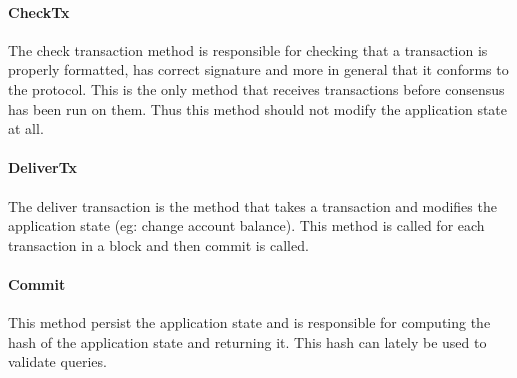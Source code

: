 \documentclass{article}
\begin{document}
	\paragraph{CheckTx}
	The check transaction method is responsible for checking that a transaction is properly formatted, has correct signature and more in general that it conforms to the protocol. This is the only method that receives transactions before consensus has been run on them. Thus this method should not modify the application state at all.
	\paragraph{DeliverTx}
	The deliver transaction is the method that takes a transaction and modifies the application state (eg: change account balance). This method is called for each transaction in a block and then commit is called.
	\paragraph{Commit}
	This method persist the application state and is responsible for computing the hash of the application state and returning it. This hash can lately be used to validate queries.
\end{document}
